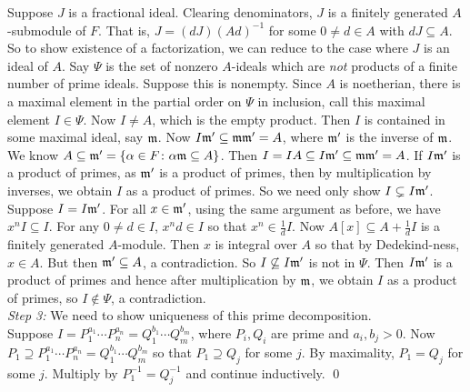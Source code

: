 \noindent Suppose $J$ is a fractional ideal. Clearing denominators, $J$ is a finitely generated $A$-submodule of $F$. That is, $J=(dJ)(Ad)^{-1}$ for some $0 \neq d \in A$ with $dJ \subseteq A$. So to show existence of a factorization, we can reduce to the case where $J $ is an ideal of $A$. Say $\Psi$ is the set of nonzero $A$-ideals which are \emph{not} products of a finite number of prime ideals. Suppose this is nonempty. Since $A$ is noetherian, there is a maximal element in the partial order on $\Psi$ in inclusion, call this maximal element $I \in \Psi$. Now $I \neq A$, which is the empty product. Then $I$ is contained in some maximal ideal, say $\mathfrak{m}$. Now $I\mathfrak{m}' \subseteq \mathfrak{m}\mathfrak{m}'=A$, where $\mathfrak{m}'$ is the inverse of $\mathfrak{m}$. We know $A \subseteq \mathfrak{m}'=\{\alpha \in F \colon \alpha \mathfrak{m}\subseteq A\}$. Then $I=IA\subseteq I \mathfrak{m}' \subseteq \mathfrak{m}\mathfrak{m}'=A$. If $I\mathfrak{m}'$ is a product of primes, as $\mathfrak{m}'$ is a product of primes, then by multiplication by inverses, we obtain $I$ as a product of primes. So we need only show $I \subsetneq I \mathfrak{m}'$. Suppose $I=I\mathfrak{m}'$. For all $x \in \mathfrak{m}'$, using the same argument as before, we have $x^nI \subseteq I$. For any $0 \neq d \in I$, $x^nd \in I$ so that $x^n \in \frac{1}{d} I$. Now $A[x] \subseteq A + \frac{1}{d} I$ is a finitely generated $A$-module. Then $x$ is integral over $A$ so that by Dedekind-ness, $x \in A$. But then $\mathfrak{m}' \subseteq A$, a contradiction. So $I \not\subseteq I \mathfrak{m}'$ is not in $\Psi$. Then $I\mathfrak{m}'$ is a product of primes and hence after multiplication by $\mathfrak{m}$, we obtain $I$ as a product of primes, so $I \notin \Psi$, a contradiction. \\

\noindent \emph{Step 3:} We need to show uniqueness of this prime decomposition. \\

\noindent Suppose $I=P_1^{a_1}\cdots P_n^{a_n}=Q_1^{b_1} \cdots Q_m^{b_m}$, where $P_i,Q_i$ are prime and $a_i,b_j >0$. Now $P_1 \supseteq P_1^{a_1}\cdots P_n^{a_n}=Q_1^{b_1} \cdots Q_m^{b_m}$ so that $P_1 \supseteq Q_j$ for some $j$. By maximality, $P_1=Q_j$ for some $j$. Multiply by $P_1^{-1}=Q_j^{-1}$ and continue inductively. \qed \\

